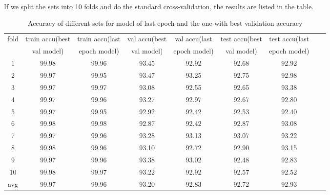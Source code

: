 If we split the sets into 10 folds and do the standard cross-validation, the results are listed in the table.
\begin{table}[!htbp]
	\centering
	\caption{Accuracy of different sets for model of  last epoch and the one with best validation accuracy }
	\label{table:cv4}
	\begin{tabular}{|c|c|c|c|c|c|c|c|c|}
		\hline
%		
fold	&	train accu(best	&	train accu(last	&	val accu(best	&	val accu(last	&	test accu(best 	&	test accu(last	\\
	&	 val model)	&	 epoch model)	&	val model)	&	 epoch model)	&	val model)	&	 epoch model)	\\\hline
1	&	99.98	&	99.96	&	93.45	&	92.92	&	92.68	&	92.92	\\\hline
2	&	99.97	&	99.95	&	93.47	&	93.25	&	92.75	&	92.98	\\\hline
3	&	99.97	&	99.97	&	93.08	&	92.55	&	92.65	&	93.38	\\\hline
4	&	99.97	&	99.96	&	93.27	&	92.97	&	92.67	&	92.80	\\\hline
5	&	99.97	&	99.95	&	92.92	&	92.42	&	92.53	&	92.40	\\\hline
6	&	99.98	&	99.98	&	92.87	&	92.42	&	92.87	&	93.08	\\\hline
7	&	99.97	&	99.96	&	93.28	&	93.13	&	93.07	&	93.22	\\\hline
8	&	99.98	&	99.96	&	93.10	&	92.72	&	92.90	&	93.15	\\\hline
9	&	99.97	&	99.96	&	93.38	&	93.02	&	92.48	&	92.83	\\\hline
10	&	99.98	&	99.97	&	93.22	&	92.92	&	92.57	&	92.52	\\\hline
avg	&	99.97	&	99.96	&	93.20	&	92.83	&	92.72	&	92.93	\\\hline	\end{tabular}
\end{table}

